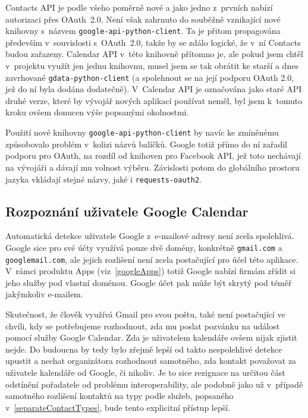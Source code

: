 \documentclass[12pt,oneside,final]{fithesis2}
\begin{document}
Contacts API je podle všeho poměrně nové a jako jedno z~prvních nabízí autorizaci přes OAuth~2.0. Není však zahrnuto do souběžně vznikající nové knihovny s~názvem {\tt google-api-python-client}. Ta je přitom propagována především v~souvislosti s~OAuth~2.0, takže by se zdálo logické, že v~ní Contacts budou zařazeny. Calendar API v~této knihovně přítomno je, ale pokud jsem chtěl v~projektu využít jen jednu knihovnu, musel jsem se tak obrátit ke starší a dnes zavrhované {\tt gdata-python-client} (a spolehnout se na její podporu OAuth 2.0, jež do ní byla dodána dodatečně). V~Calendar API je označována jako staré API druhé verze, které by vývojář nových aplikací používat neměl, byl jsem k~tomuto kroku ovšem donucen výše popsanými okolnostmi.

Použití nové knihovny {\tt google-api-python-client} by navíc ke zmí\-ně\-né\-mu způsobovalo problém v~kolizi názvů balíčků. Google totiž přímo do ní zařadil podporu pro OAuth, na rozdíl od knihoven pro Facebook API, jež toto nechávají na vývojáři a dávají mu volnost výběru. Závislosti potom do globálního prostoru jazyka vkládají stejné názvy, jaké i {\tt requests-oauth2}.

\subsection{Rozpoznání uživatele Google Calendar}
Automatická detekce uživatele Google z~e-mailové adresy není zcela spolehlivá. Google sice pro své účty využívá pouze dvě domény, konkrétně {\tt gmail.com} a {\tt googlemail.com}, ale jejich rozlišení není zcela postačující pro účel této apli\-ka\-ce. V~rám\-ci produktu Apps (viz~\ref{googleApps}) totiž Google nabízí firmám zřídit si jeho služby pod vlastní doménou. Google účet pak může být skrytý pod téměř ja\-kým\-ko\-liv e-mail\-em.

Skutečnost, že člověk využívá Gmail pro svou poštu, také není postačující ve chvíli, kdy se potřebujeme rozhodnout, zda mu poslat pozvánku na událost pomocí služby Google Calendar. Zda je uživatelem kalendáře ovšem nijak zjis\-tit nej\-de. Do budoucna by tedy bylo zřejmě lepší od takto nespolehlivé detekce upustit a nechat organizátora rozhodnout samotného, zda kontakt považovat za uživatele kalendáře od Google, či nikoliv. Je to sice rezignace na určitou část odstínění pořadatele od problému interoperability, ale podobně jako už v~případě samotného rozlišení kontaktů na typy podle služeb, popsaného v~\ref{separateContactTypes}, bude tento explicitní přístup lepší.
\end{document}
